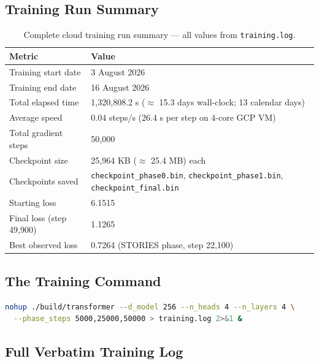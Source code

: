 \documentclass[12pt, a4paper]{article}
\begin{document}
\subsection{Training Run Summary}

\begin{table}[!ht]
\centering
\renewcommand{\arraystretch}{1.3}
\begin{tabular}{@{} l l @{}}
\toprule
\textbf{Metric} & \textbf{Value} \\
\midrule
Training start date         & 3 August 2026 \\
Training end date           & 16 August 2026 \\
Total elapsed time          & 1,320,808.2 s ($\approx$ 15.3 days wall-clock; 13 calendar days) \\
Average speed               & 0.04 steps/s (26.4 s per step on 4-core GCP VM) \\
Total gradient steps        & 50,000 \\
Checkpoint size             & 25,964 KB ($\approx$ 25.4 MB) each \\
Checkpoints saved           & \texttt{checkpoint\_phase0.bin}, \texttt{checkpoint\_phase1.bin}, \texttt{checkpoint\_final.bin} \\
Starting loss               & 6.1515 \\
Final loss (step 49,900)    & 1.1265 \\
Best observed loss          & 0.7264 (STORIES phase, step 22,100) \\
\bottomrule
\end{tabular}
\caption{Complete cloud training run summary --- all values from \texttt{training.log}.}
\end{table}

\subsection{The Training Command}

\begin{lstlisting}[language=bash, caption={Cloud Training Command (launched via nohup on GCP VM)}, numbers=none]
nohup ./build/transformer --d_model 256 --n_heads 4 --n_layers 4 \
  --phase_steps 5000,25000,50000 > training.log 2>&1 &
\end{lstlisting}

\subsection{Full Verbatim Training Log}
\end{document}
